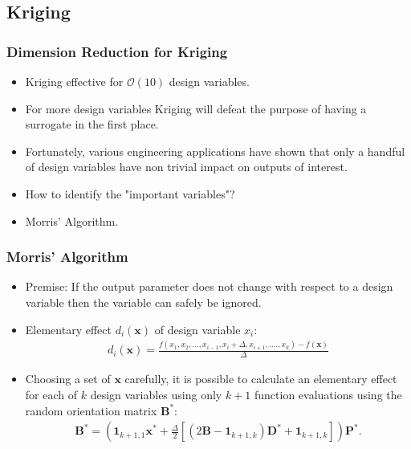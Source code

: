 \subsection{Kriging}

\begin{frame}
\frametitle{Dimension Reduction for Kriging}

\begin{itemize}
  \item Kriging effective for $\mathcal{O}(10)$ design variables.
  \item For more design variables Kriging will defeat the purpose of having a surrogate in the first place.
  \item Fortunately, various engineering applications have shown that only a handful of design variables have non trivial impact on outputs of interest.
  \item How to identify the "important variables"?
  \item Morris' Algorithm.   
\end{itemize}

\end{frame}
\begin{frame}
\frametitle{Morris' Algorithm}

\begin{itemize}
  \item Premise: If the output parameter does not change with respect to a design variable then the variable can safely be ignored.
  \item Elementary effect $d_i\left(\textbf{x}\right)$ of design variable $x_i$:
\begin{align*}
 d_i\left(\textbf{x}\right) = \frac{f\left(x_1,x_2,...,x_{i-1},x_i+\Delta,x_{i+1},....,x_k 									\right) - f\left(\textbf{x}\right)}{\Delta}      
\end{align*} 
  \item Choosing a set of $\textbf{x}$ carefully, it is possible to calculate an elementary effect for each of $k$ design variables using only $k+1$ function evaluations using the random orientation matrix $\textbf{B}^*$: 
\begin{align*}
 \textbf{B}^* = \left(\textbf{1}_{k+1,1}\textbf{x}^* + \frac{\Delta}{2}\left[
                 \left(2\textbf{B} - \textbf{1}_{k+1,k}\right)\textbf{D}^* + 
                  \textbf{1}_{k+1,k}\right]\right)\textbf{P}^*.
\end{align*}                
\end{itemize}

\end{frame}
